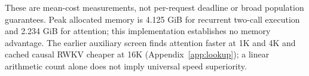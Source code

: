These are mean-cost measurements, not per-request deadline or broad population
guarantees. Peak allocated memory is 4.125 GiB for recurrent two-call execution
and 2.234 GiB for attention; this implementation establishes no memory advantage.
The earlier auxiliary screen finds attention faster at 1K and 4K and cached
causal RWKV cheaper at 16K (Appendix~\ref{app:lookup}); a linear arithmetic
count alone does not imply universal speed superiority.

